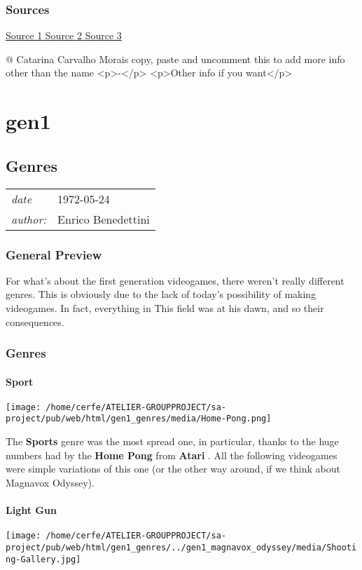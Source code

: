 \documentclass[a4paper,10pt]{book}
\newcommand{\pageHeader}[4]{
    \section{#1}
    \vspace{-0.3cm}
    \begin{table}[h!]
     \begin{tabular}{ll}
        \hline
        \textit{date} & #2 \\
        \textit{author: } & #3\\
        \hline
     \end{tabular}
    \end{table}
    \vspace{-0.3cm}
}
\begin{document}
 
 \subsection{Sources }
 
 \href{https://en.wikipedia.org/wiki/Computer_Space}{Source 1 }
 \href{https://www.arcade-museum.com/game_detail.php?game_id=7381}{Source 2 }
 \href{https://www.technologizer.com/2011/12/11/computer-space-and-the-dawn-of-the-arcade-video-game/}{Source 3 }
 
 
 
 @ Catarina Carvalho Morais 
  copy, paste and uncomment this to add more info other than the name
            <p>-</p>
            <p>Other info if you want</p>
           
 
 \newpage\chapter{gen1}\newpage\pageHeader{Genres}{1972-05-24}{Enrico Benedettini}{A briefly recap about the various first generation genres.}
 \subsection{General Preview }
 
          For what's about the first generation videogames, there weren't really different genres. This is
          obviously due to the lack of today's possibility of making videogames. In fact, everything in This
          field was at his dawn, and so their consequences.
         
 
 \subsection{Genres }
 \subsubsection{Sport }
 \texttt{[image: /home/cerfe/ATELIER-GROUPPROJECT/sa-project/pub/web/html/gen1\_genres/media/Home-Pong.png]}
 
          The  \textbf{Sports }  genre was the most spread one, in particular, thanks to the huge
          numbers had by the  \textbf{Home Pong }  from  \textbf{Atari } . All the following videogames
          were simple variations of this one (or the other way around, if we think about Magnavox Odyssey).
         
 
 \subsubsection{Light Gun }
 \texttt{[image: /home/cerfe/ATELIER-GROUPPROJECT/sa-project/pub/web/html/gen1\_genres/../gen1\_magnavox\_odyssey/media/Shooting-Gallery.jpg]}
 
\end{document}
